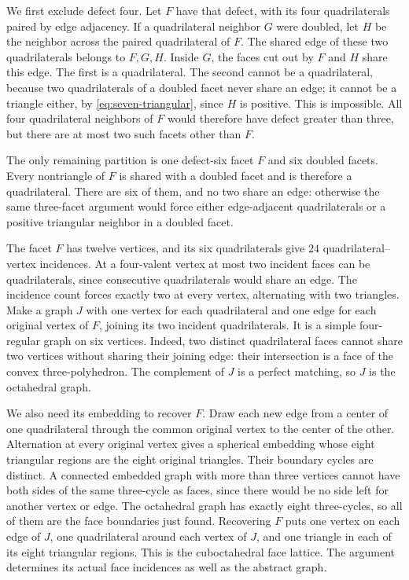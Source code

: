 \documentclass[11pt]{article}
\theoremstyle{remark}
\begin{document}
We first exclude defect four. Let $F$ have that defect, with its
four quadrilaterals paired by edge adjacency. If a quadrilateral
neighbor $G$ were doubled, let $H$ be the neighbor across the paired
quadrilateral of $F$. The shared edge of these two quadrilaterals
belongs to $F,G,H$. Inside $G$, the faces cut out by $F$ and $H$
share this edge. The first is a quadrilateral. The second cannot
be a quadrilateral, because two quadrilaterals of a doubled facet
never share an edge; it cannot be a triangle either, by
\eqref{eq:seven-triangular}, since $H$ is positive. This is
impossible. All four quadrilateral neighbors of $F$ would therefore
have defect greater than three, but there are at most two such
facets other than $F$.

The only remaining partition is one defect-six facet $F$ and six
doubled facets. Every nontriangle of $F$ is shared with a doubled
facet and is therefore a quadrilateral. There are six of them,
and no two share an edge: otherwise the same three-facet argument
would force either edge-adjacent quadrilaterals or a positive
triangular neighbor in a doubled facet.

The facet $F$ has twelve vertices, and its six quadrilaterals give
$24$ quadrilateral--vertex incidences. At a four-valent vertex at
most two incident faces can be quadrilaterals, since consecutive
quadrilaterals would share an edge. The incidence count forces
exactly two at every vertex, alternating with two triangles.
Make a graph $J$ with one vertex for each quadrilateral and one
edge for each original vertex of $F$, joining its two incident
quadrilaterals. It is a simple four-regular graph on six vertices.
Indeed, two distinct quadrilateral faces cannot share two vertices
without sharing their joining edge: their intersection is a face
of the convex three-polyhedron. The complement of $J$ is a perfect
matching, so $J$ is the octahedral graph.

We also need its embedding to recover $F$. Draw each new edge
from a center of one quadrilateral through the common original
vertex to the center of the other. Alternation at every original
vertex gives a spherical embedding whose eight triangular regions
are the eight original triangles. Their boundary cycles are
distinct. A connected embedded graph with more than three vertices
cannot have both sides of the same three-cycle as faces, since
there would be no side left for another vertex or edge. The
octahedral graph has exactly eight three-cycles, so all of them are
the face boundaries just found. Recovering $F$ puts one vertex on
each edge of $J$, one quadrilateral around each vertex of $J$, and
one triangle in each of its eight triangular regions. This is the
cuboctahedral face lattice. The argument determines its actual
face incidences as well as the abstract graph.
\end{document}
